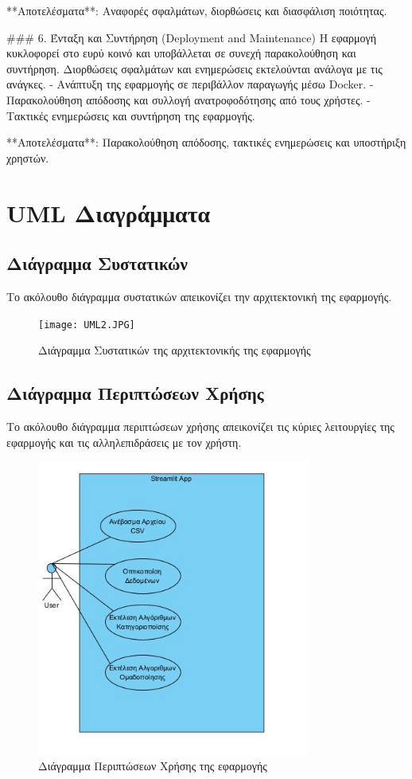 \documentclass[a4paper,12pt]{article}
\begin{document}
**Αποτελέσματα**: Αναφορές σφαλμάτων, διορθώσεις και διασφάλιση ποιότητας.

### 6. Ένταξη και Συντήρηση (\textlatin{Deployment and Maintenance})
Η εφαρμογή κυκλοφορεί στο ευρύ κοινό και υποβάλλεται σε συνεχή παρακολούθηση και συντήρηση. Διορθώσεις σφαλμάτων και ενημερώσεις εκτελούνται ανάλογα με τις ανάγκες.
- Ανάπτυξη της εφαρμογής σε περιβάλλον παραγωγής μέσω \textlatin{Docker}.
- Παρακολούθηση απόδοσης και συλλογή ανατροφοδότησης από τους χρήστες.
- Τακτικές ενημερώσεις και συντήρηση της εφαρμογής.

**Αποτελέσματα**: Παρακολούθηση απόδοσης, τακτικές ενημερώσεις και υποστήριξη χρηστών.

\section{UML Διαγράμματα}
\label{sec:uml}

\subsection{Διάγραμμα Συστατικών}
Το ακόλουθο διάγραμμα συστατικών απεικονίζει την αρχιτεκτονική της εφαρμογής.

\begin{figure}[h!]
\centering
\texttt{[image: UML2.JPG]}
\caption{Διάγραμμα Συστατικών της αρχιτεκτονικής της εφαρμογής}
\label{fig:component}
\end{figure}

\subsection{Διάγραμμα Περιπτώσεων Χρήσης}
Το ακόλουθο διάγραμμα περιπτώσεων χρήσης απεικονίζει τις κύριες λειτουργίες της εφαρμογής και τις αλληλεπιδράσεις με τον χρήστη.

\begin{figure}[h!]
\centering
\includegraphics[width=0.8\textwidth]{UML1.JPG}
\caption{Διάγραμμα Περιπτώσεων Χρήσης της εφαρμογής}
\label{fig:usecase}
\end{figure}
\end{document}
